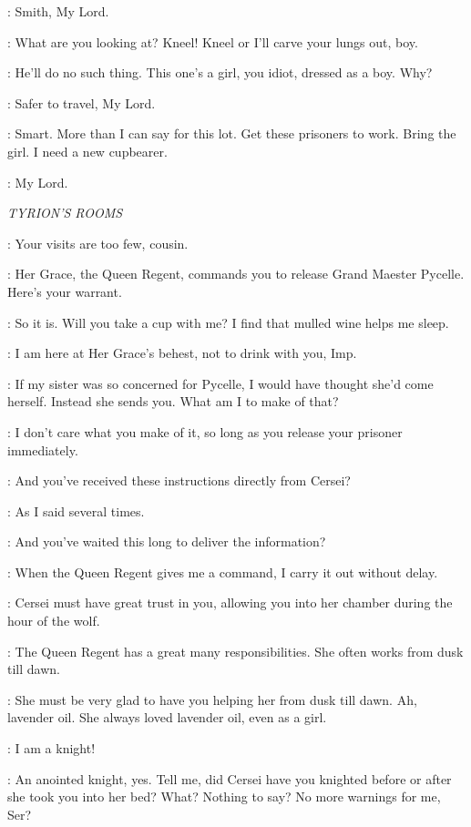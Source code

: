 \GENDRY: Smith, My Lord. 

\POLLIVER:  What are you looking at? Kneel! Kneel or I'll carve your lungs out, boy. 

\TYWIN: He'll do no such thing. This one's a girl, you idiot, dressed as a boy. Why? 

\ARYA: Safer to travel, My Lord. 

\TYWIN: Smart. More than I can say for this lot. Get these prisoners to work. Bring the girl. I need a new cupbearer. 

\MOUNTAIN: My Lord. 


\scene

\textit{TYRION'S ROOMS} 


\TYRION: Your visits are too few, cousin. 

\LANCEL: Her Grace, the Queen Regent, commands you to release Grand Maester Pycelle. Here's your warrant. 

\TYRION: So it is. Will you take a cup with me? I find that mulled wine helps me sleep. 

\LANCEL: I am here at Her Grace's behest, not to drink with you, Imp. 

\TYRION: If my sister was so concerned for Pycelle, I would have thought she'd come herself. Instead she sends you. What am I to make of that? 

\LANCEL: I don't care what you make of it, so long as you release your prisoner immediately. 

\TYRION: And you've received these instructions directly from Cersei? 

\LANCEL: As I said several times. 

\TYRION: And you've waited this long to deliver the information? 

\LANCEL: When the Queen Regent gives me a command, I carry it out without delay. 

\TYRION: Cersei must have great trust in you, allowing you into her chamber during the hour of the wolf. 

\LANCEL: The Queen Regent has a great many responsibilities. She often works from dusk till dawn. 

\TYRION: She must be very glad to have you helping her from dusk till dawn. Ah, lavender oil. She always loved lavender oil, even as a girl. 

\LANCEL: I am a knight! 

\TYRION: An anointed knight, yes. Tell me, did Cersei have you knighted before or after she took you into her bed? What? Nothing to say? No more warnings for me, Ser? 

